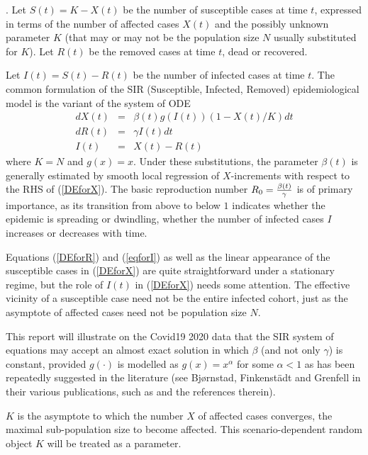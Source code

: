 \documentclass{article}
\begin{document}
. Let $S(t) = K - X(t)$ be the number of susceptible cases at time $t$, expressed in terms of the number of affected cases $X(t)$ and the possibly unknown parameter $K$ (that may or may not be the population size $N$ usually substituted for $K$). Let $R(t)$ be the removed cases at time $t$, dead or recovered.

Let $I(t)=S(t)-R(t)$ be the number of infected cases at time $t$. The common formulation of the SIR (Susceptible, Infected, Removed) epidemiological model is the variant of the system of ODE
\begin{eqnarray}
dX(t) & = & \beta(t) g(I(t)) (1 - X(t)/K) dt \label{DEforX} \\
dR(t) & = & \gamma I(t) dt \label{DEforR} \\
I(t) & = & X(t)-R(t) \label{eqforI}
\end{eqnarray}
where $K=N$ and $g(x)=x$. Under these substitutions, the parameter $\beta(t)$ is generally estimated by smooth local regression of $X$-increments with respect to the RHS of (\ref{DEforX}). The basic reproduction number $R_0={{\beta(t)} \over \gamma}$ is of primary importance, as its transition from above to below $1$ indicates whether the epidemic is spreading or dwindling, whether the number of infected cases $I$ increases or decreases with time.

\bigskip

Equations (\ref{DEforR}) and (\ref{eqforI}) as well as the linear appearance of the susceptible cases in (\ref{DEforX}) are quite straightforward under a stationary regime, but the role of $I(t)$ in (\ref{DEforX}) needs some attention. The effective vicinity of a susceptible case need not be the entire infected cohort, just as the asymptote of affected cases need not be population size $N$.

This report will illustrate on the Covid19 2020 data that
the SIR system of equations may accept an almost exact solution in which $\beta$ (and not only $\gamma$) is constant, provided $g(\cdot)$ is modelled as $g(x)=x^\alpha$
for some $\alpha<1$ as has been repeatedly suggested in the literature (see Bj{\o}rnstad, Finkenst\"{a}dt and Grenfell in their various publications, such as \cite{AAA} and the references therein).

$K$ is the asymptote to which the number $X$ of affected cases converges, the maximal sub-population size to become affected. This scenario-dependent random object $K$ will be treated as a parameter.
\end{document}
